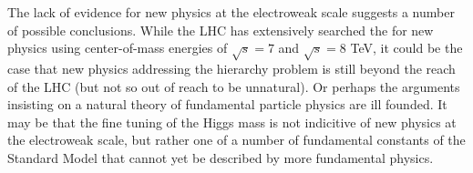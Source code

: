 The lack of evidence for new physics at the electroweak scale suggests a number of possible conclusions.
While the LHC has extensively searched the for new physics using center-of-mass energies of $\sqrt{s}=7$ and $\sqrt{s} = 8$ TeV,
it could be the case that new physics addressing the hierarchy problem is still beyond the reach
of the LHC (but not so out of reach to be unnatural).
Or perhaps the arguments insisting on a natural theory of fundamental particle physics are ill founded.
It may be that the fine tuning of the Higgs mass is not indicitive of new physics at the electroweak scale,
but rather one of a number of fundamental constants of the Standard Model that cannot yet be described
by more fundamental physics.


